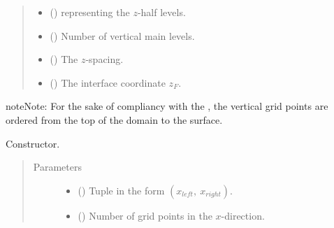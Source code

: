 \documentclass[letterpaper,10pt,english]{sphinxmanual}
\begin{document}
\begin{fulllineitems}
\begin{quote}
\begin{description}
\begin{itemize}
\item {} 
 () \textendash{} {\hyperref[\detokenize{api:grids.axis.Axis}]{}} representing the \(z\)-half levels.

\item {} 
 () \textendash{} Number of vertical main levels.

\item {} 
 () \textendash{} The \(z\)-spacing.

\item {} 
 () \textendash{} The interface coordinate \(z_F\).

\end{itemize}

\end{description}\end{quote}

\begin{sphinxadmonition}{note}{Note:}
For the sake of compliancy with the , the vertical grid points are
ordered from the top of the domain to the surface.
\end{sphinxadmonition}

\begin{fulllineitems}
\label{\detokenize{api:grids.grid_xz.GridXZ.__init__}}
Constructor.
\begin{quote}\begin{description}
\item[{Parameters}] \leavevmode\begin{itemize}
\item {} 
 () \textendash{} Tuple in the form \((x_{left}, ~ x_{right})\).

\item {} 
 () \textendash{} Number of grid points in the \(x\)-direction.


\end{itemize}
\end{description}
\end{quote}
\end{fulllineitems}
\end{fulllineitems}
\end{document}
